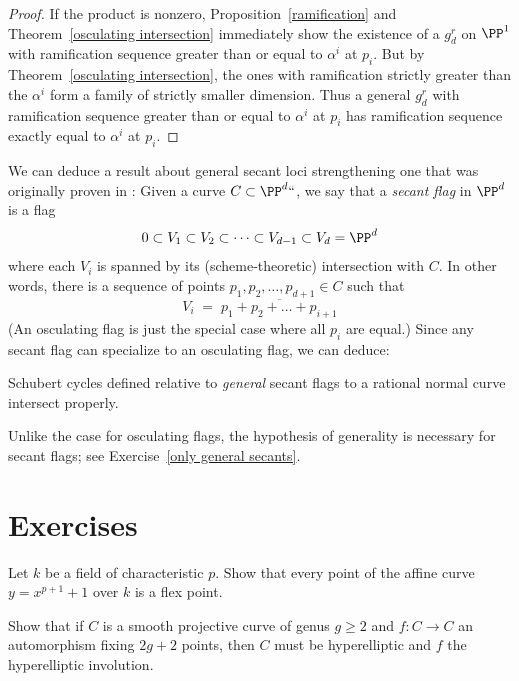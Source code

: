 \begin{proof}
If the product is nonzero, Proposition~\ref{ramification} and
Theorem~\ref{osculating intersection} immediately show the existence of
a $g^r_d$ on $\PP^1$ with ramification sequence greater than or equal
to $\alpha^i$ at $p_i$. But by Theorem~\ref{osculating intersection},
the ones with ramification strictly greater than the $\alpha^i$ form
a family of strictly smaller dimension. Thus a general $g^r_d$ with
ramification sequence greater than or equal to $\alpha^i$ at $p_i$
has  ramification sequence exactly equal to $\alpha^i$ at $p_i$.
\end{proof}

We can deduce a result about general secant loci
%
strengthening one that
was originally proven in \cite{Griffiths-Harris-BN}:
Given a curve $C \subset \PP^d` `$, we say that a \emph{secant flag}
in $\PP^d$ is a flag
$$
0 \subset V_1 \subset V_2 \subset \dots \subset V_{d-1} \subset V_d
= \PP^d
$$
where each $V_i$ is spanned by its (scheme-theoretic) intersection with
$C$. In other words, there is a sequence of points $p_1, p_2, \dots,
p_{d+1} \in C$ such that
$$
V_i \; = \; \overline{p_1+p_2+ \dots + p_{i+1}}
$$
(An osculating flag is just the special case where all $p_i$ are
equal.) Since any secant flag can specialize to an osculating flag,
we can deduce:

\begin{corollary}\label{secant schubert proper}
Schubert cycles defined relative to \emph{general} secant flags to a
rational normal curve intersect properly.
\end{corollary}

Unlike the case for osculating flags, the hypothesis of generality is
necessary for secant flags; see Exercise~\ref{only general secants}.

\section{Exercises}
\begin{exercise}\label{inseparable Gauss}
Let $k$ be a field of
characteristic $p$.
%
Show that every point of the
affine curve $y = x^{p+1}+1$ over $k$ is a flex point.
\end{exercise}

\begin{exercise}\label{2g+2fixedpoints}
Show that if $C$ is a smooth projective curve of genus $g \geq 2$ and
$f : C \to C$ an automorphism fixing $2g+2$ points, then $C$ must be
hyperelliptic
%
and $f$ the hyperelliptic involution.
\end{exercise}

